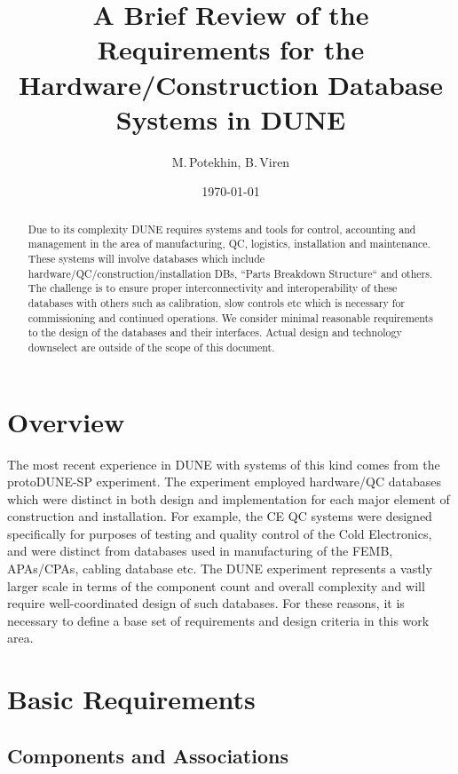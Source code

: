 \documentclass[pdftex,12pt,letter]{article}
\title{A Brief Review of the Requirements for the Hardware/Construction Database Systems in DUNE}
\date{\today}
\author{M.\,Potekhin, B.\,Viren}
\begin{document}
\maketitle

\begin{abstract}
\noindent  Due to its complexity DUNE requires systems and tools for control, accounting and
management in the area of manufacturing, QC, logistics, installation and maintenance. These systems
will involve databases which include hardware/QC/construction/installation DBs,
``Parts Breakdown Structure`` and others. The challenge is to ensure proper
interconnectivity and interoperability of these databases with others such as calibration,
slow controls etc which is necessary for commissioning and continued
operations. We consider minimal reasonable requirements to the design of the databases
and their interfaces. Actual design and technology downselect are outside of the scope of
this document.

\end{abstract}


\section{Overview}

The most recent experience in DUNE with systems of this kind comes from the protoDUNE-SP experiment.
The experiment employed hardware/QC databases which were distinct in both
design and implementation for each major element of construction and installation. For example, the CE QC
systems were designed specifically for purposes of testing and quality control of the Cold Electronics,
and were distinct from databases used in manufacturing of the FEMB, APAs/CPAs, cabling database etc.
The DUNE experiment represents a vastly larger scale in terms of the component count and
overall complexity and will require well-coordinated design of such databases. For these reasons,
it is necessary to define a base set of requirements and design criteria in this work area.

\section{Basic Requirements}
\subsection{Components and Associations}
\end{document}
